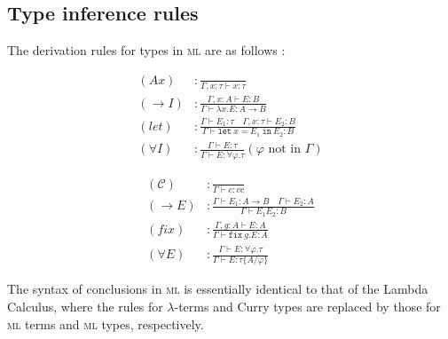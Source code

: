 \subsection{Type inference rules}
The derivation rules for types in \textsc{ml} are as follows \cite{van-bakel:2022}:
\begin{center}
    \begin{minipage}{.4\textwidth}
        \begin{align*}
            (\mathit{Ax}) &: \frac{}{\Gamma, x: \tau \vdash x: \tau} \\[1em]
            (\rightarrow I) &: \frac{\Gamma, x: A \vdash E: B}{\Gamma \vdash \lambda x. E: A \rightarrow B} \\[1em]
            (\mathit{let}) &: \frac{\Gamma \vdash E_1: \tau \quad \Gamma, x: \tau \vdash E_2: B}{\Gamma \vdash \texttt{let}\ x = E_1\ \texttt{in}\ E_2: B} \\[1em]
            (\forall I) &: \frac{\Gamma \vdash E: \tau}{\Gamma \vdash E: \forall \varphi. \tau} (\text{$\varphi$ not in $\Gamma$})
        \end{align*}
    \end{minipage}%
    \begin{minipage}{.4\textwidth}
        \begin{align*}
            (\mathcal{C}) &: \frac{}{\Gamma \vdash c: vc} \\[1em]
            (\rightarrow E) &: \frac{\Gamma \vdash E_1: A \rightarrow B \quad \Gamma \vdash E_2: A}{\Gamma \vdash E_1 E_2: B} \\[1em]
            (\mathit{fix}) &: \frac{\Gamma, g: A \vdash E: A}{\Gamma \vdash \texttt{fix}\ g. E: A} \\[1em]
            (\forall E) &: \frac{\Gamma \vdash E: \forall \varphi. \tau}{\Gamma \vdash E: \tau \{A / \varphi\}}
        \end{align*}
    \end{minipage}
\end{center}
The syntax of conclusions in \textsc{ml} is essentially identical to that of the Lambda Calculus, where the rules for $\lambda$-terms and Curry types are replaced by those for \textsc{ml} terms and \textsc{ml} types, respectively.